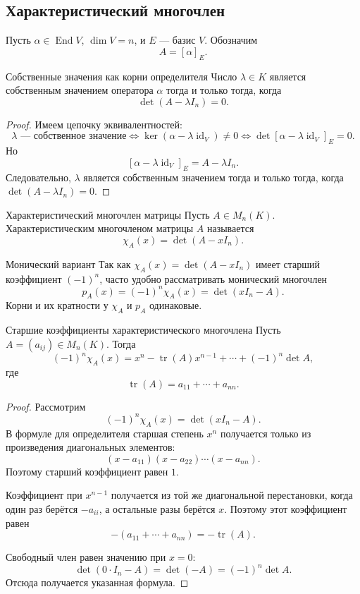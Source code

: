 \subsection{Характеристический многочлен}

Пусть $\alpha\in \operatorname{End} V$, $\dim V=n$, и $E$ --- базис $V$.
Обозначим
\[
A=[\alpha]_E.
\]

\begin{Statement}{Собственные значения как корни определителя}{}
	Число $\lambda\in K$ является собственным значением оператора $\alpha$ тогда и только тогда, когда
	\[
	\det(A-\lambda I_n)=0.
	\]
\end{Statement}

\begin{proof}
	Имеем цепочку эквивалентностей:
	\[
	\lambda \text{ --- собственное значение}
	\Longleftrightarrow
	\ker(\alpha-\lambda\operatorname{id}_V)\ne 0
	\Longleftrightarrow
	\det[\alpha-\lambda\operatorname{id}_V]_E=0.
	\]
	Но
	\[
	[\alpha-\lambda\operatorname{id}_V]_E=A-\lambda I_n.
	\]
	Следовательно, $\lambda$ является собственным значением тогда и только тогда, когда
	$\det(A-\lambda I_n)=0$.
\end{proof}

\begin{Definition}{Характеристический многочлен матрицы}{}
	Пусть $A\in M_n(K)$. Характеристическим многочленом матрицы $A$ называется
	\[
	\chi_A(x)=\det(A-xI_n).
	\]
\end{Definition}

\begin{Remark}{Монический вариант}{}
	Так как $\chi_A(x)=\det(A-xI_n)$ имеет старший коэффициент $(-1)^n$, часто удобно рассматривать
	монический многочлен
	\[
	p_A(x)=(-1)^n\chi_A(x)=\det(xI_n-A).
	\]
	Корни и их кратности у $\chi_A$ и $p_A$ одинаковые.
\end{Remark}

\begin{Theorem}{Старшие коэффициенты характеристического многочлена}{}
	Пусть $A=(a_{ij})\in M_n(K)$. Тогда
	\[
	(-1)^n\chi_A(x)
	=
	x^n-\operatorname{tr}(A)x^{n-1}+\cdots+(-1)^n\det A,
	\]
	где
	\[
	\operatorname{tr}(A)=a_{11}+\cdots+a_{nn}.
	\]
\end{Theorem}

\begin{proof}
	Рассмотрим
	\[
	(-1)^n\chi_A(x)=\det(xI_n-A).
	\]
	В формуле для определителя старшая степень $x^n$ получается только из произведения
	диагональных элементов:
	\[
	(x-a_{11})(x-a_{22})\cdots(x-a_{nn}).
	\]
	Поэтому старший коэффициент равен $1$.
	
	Коэффициент при $x^{n-1}$ получается из той же диагональной перестановки, когда один раз
	берётся $-a_{ii}$, а остальные разы берётся $x$. Поэтому этот коэффициент равен
	\[
	-(a_{11}+\cdots+a_{nn})=-\operatorname{tr}(A).
	\]
	
	Свободный член равен значению при $x=0$:
	\[
	\det(0\cdot I_n-A)=\det(-A)=(-1)^n\det A.
	\]
	Отсюда получается указанная формула.
\end{proof}

